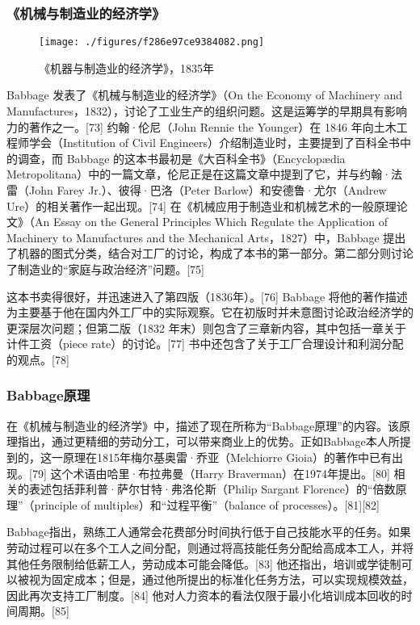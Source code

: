 \subsubsection{《机械与制造业的经济学》}
\begin{figure}[ht]
\centering
\texttt{[image: ./figures/f286e97ce9384082.png]}
\caption{《机器与制造业的经济学》，1835年} \label{fig_CRSBQ_5}
\end{figure}
Babbage 发表了《机械与制造业的经济学》（On the Economy of Machinery and Manufactures，1832），讨论了工业生产的组织问题。这是运筹学的早期具有影响力的著作之一。[73] 约翰·伦尼（John Rennie the Younger）在 1846 年向土木工程师学会（Institution of Civil Engineers）介绍制造业时，主要提到了百科全书中的调查，而 Babbage 的这本书最初是《大百科全书》（Encyclopædia Metropolitana）中的一篇文章，伦尼正是在这篇文章中提到了它，并与约翰·法雷（John Farey Jr.）、彼得·巴洛（Peter Barlow）和安德鲁·尤尔（Andrew Ure）的相关著作一起出现。[74] 在《机械应用于制造业和机械艺术的一般原理论文》（An Essay on the General Principles Which Regulate the Application of Machinery to Manufactures and the Mechanical Arts，1827）中，Babbage 提出了机器的图式分类，结合对工厂的讨论，构成了本书的第一部分。第二部分则讨论了制造业的“家庭与政治经济”问题。[75]

这本书卖得很好，并迅速进入了第四版（1836年）。[76] Babbage 将他的著作描述为主要基于他在国内外工厂中的实际观察。它在初版时并未意图讨论政治经济学的更深层次问题；但第二版（1832 年末）则包含了三章新内容，其中包括一章关于计件工资（piece rate）的讨论。[77] 书中还包含了关于工厂合理设计和利润分配的观点。[78]
\subsubsection{Babbage原理 } 
在《机械与制造业的经济学》中，描述了现在所称为“Babbage原理”的内容。该原理指出，通过更精细的劳动分工，可以带来商业上的优势。正如Babbage本人所提到的，这一原理在1815年梅尔基奥雷·乔亚（Melchiorre Gioia）的著作中已有出现。[79] 这个术语由哈里·布拉弗曼（Harry Braverman）在1974年提出。[80] 相关的表述包括菲利普·萨尔甘特·弗洛伦斯（Philip Sargant Florence）的“倍数原理”（principle of multiples）和“过程平衡”（balance of processes）。[81][82]

Babbage指出，熟练工人通常会花费部分时间执行低于自己技能水平的任务。如果劳动过程可以在多个工人之间分配，则通过将高技能任务分配给高成本工人，并将其他任务限制给低薪工人，劳动成本可能会降低。[83] 他还指出，培训或学徒制可以被视为固定成本；但是，通过他所提出的标准化任务方法，可以实现规模效益，因此再次支持工厂制度。[84] 他对人力资本的看法仅限于最小化培训成本回收的时间周期。[85]
